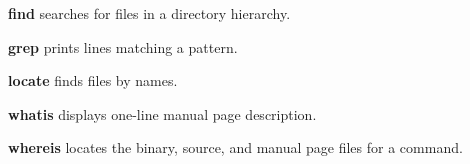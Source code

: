 \begin{enumx}
\item [\cmd] \textbf{find} searches for files in a directory hierarchy.
\item [\cmd] \textbf{grep} prints lines matching a pattern.
\item [\cmd] \textbf{locate} finds files by names.
\item [\cmd] \textbf{whatis} displays one-line manual page description.
\item [\cmd] \textbf{whereis} locates the binary, source, 
and manual page files for a command.
\end{enumx}
